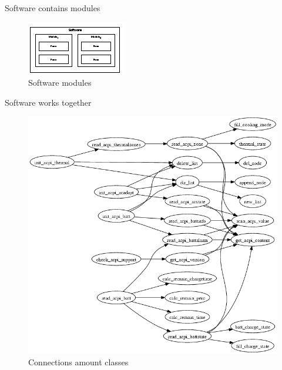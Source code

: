 \documentclass{beamer}
\begin{document}
\begin{frame}{Software contains modules}
    \begin{figure}
        \includegraphics[width=.7\paperwidth]{figure/software-modules}
        \caption{Software modules}
        \label{fig:softwareModules}
    \end{figure}
\end{frame}

\begin{frame}{Software works together}
    \begin{figure}
        \includegraphics[height=.7\paperheight]{figure/graph.png}
        \caption{Connections amount classes}
        \label{fig:classConnection}
    \end{figure}
\end{frame}

\end{document}
